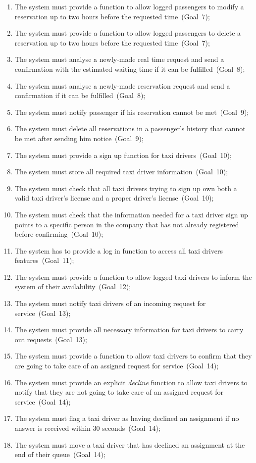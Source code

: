 \begin{enumerate}
\item The system must provide a function to allow logged passengers to modify a reservation up to two hours before the requested time~(Goal~7);
\item The system must provide a function to allow logged passengers to delete a reservation up to two hours before the requested time~(Goal~7);

\item The system must analyse a newly-made real time request and send a confirmation with the estimated waiting time if it can be fulfilled~(Goal~8);
\item The system must analyse a newly-made reservation request and send a confirmation if it can be fulfilled~(Goal~8);

\item The system must notify passenger if his reservation cannot be met~(Goal~9);
\item The system must delete all reservations in a passenger's history that cannot be met after sending him notice~(Goal~9);

\item The system must provide a sign up function for taxi drivers~(Goal~10);
\item The system must store all required taxi driver information~(Goal~10);
\item The system must check that all taxi drivers trying to sign up own both a valid taxi driver's license and a proper driver's license~(Goal~10);
\item The system must check that the information needed for a taxi driver sign up points to a specific person in the company that has not already registered before confirming~(Goal~10);

\item The system has to provide a log in function to access all taxi drivers features~(Goal~11);

\item The system must provide a function to allow logged taxi drivers to inform the system of their availability~(Goal~12);

\item The system must notify taxi drivers of an incoming request for service~(Goal~13);
\item The system must provide all necessary information for taxi drivers to carry out requests~(Goal~13);

\item The system must provide a function to allow taxi drivers to confirm that they are going to take care of an assigned request for service~(Goal~14);
\item The system must provide an explicit \emph{decline} function to allow taxi drivers to notify that they are not going to take care of an assigned request for service~(Goal~14);
\item The system must flag a taxi driver as having declined an assignment if no answer is received within 30 seconds~(Goal~14);
\item The system must move a taxi driver that has declined an assignment at the end of their queue~(Goal~14);


\end{enumerate}
